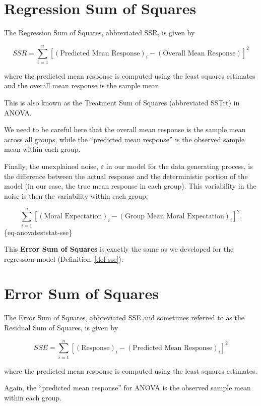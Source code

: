 \documentclass[
  letterpaper,
  DIV=11,
  numbers=noendperiod]{scrreprt}
\theoremstyle{plain}
\theoremstyle{definition}
\theoremstyle{definition}
\theoremstyle{remark}
\begin{document}
\section{Regression Sum of Squares}\label{regression-sum-of-squares-1}

The Regression Sum of Squares, abbreviated SSR, is given by

\[SSR = \sum_{i=1}^{n} \left[(\text{Predicted Mean Response})_i - (\text{Overall Mean Response})\right]^2\]

where the predicted mean response is computed using the least squares
estimates and the overall mean response is the sample mean.

This is also known as the Treatment Sum of Squares (abbreviated SSTrt)
in ANOVA.

We need to be careful here that the overall mean response is the sample
mean across all groups, while the ``predicted mean response'' is the
observed sample mean within each group.

Finally, the unexplained noise, \(\varepsilon\) in our model for the
data generating process, is the difference between the actual response
and the deterministic portion of the model (in our case, the true mean
response in each group). This variability in the noise is then the
variability within each group:

\[\sum_{i=1}^{n} \left[(\text{Moral Expectation})_i - (\text{Group Mean Moral Expectation})_i\right]^2.\]
\{eq-anovateststat-sse\}

This \textbf{Error Sum of Squares} is exactly the same as we developed
for the regression model (Definition~\ref{def-sse}):

\section{Error Sum of Squares}\label{error-sum-of-squares-1}

The Error Sum of Squares, abbreviated SSE and sometimes referred to as
the Residual Sum of Squares, is given by

\[SSE = \sum_{i=1}^{n} \left[(\text{Response})_i - (\text{Predicted Mean Response})_i\right]^2\]

where the predicted mean response is computed using the least squares
estimates.

Again, the ``predicted mean response'' for ANOVA is the observed sample
mean within each group.
\end{document}
